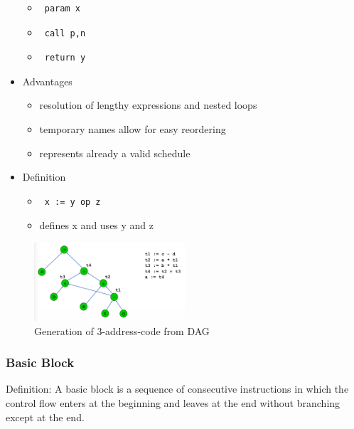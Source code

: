 \begin{itemize}
\begin{itemize}
	\item \begin{verbatim} param x\end{verbatim}
	\item \begin{verbatim} call p,n\end{verbatim}
	\item \begin{verbatim} return y\end{verbatim}
\end{itemize}
\item Advantages
\begin{itemize}
	\item resolution of lengthy expressions and nested loops
	\item temporary names allow for easy reordering
	\item represents already a valid schedule
\end{itemize}
\item Definition
\begin{itemize}
	\item \begin{verbatim} x := y op z\end{verbatim}
	\item defines x and uses y and z
\end{itemize}
\end{itemize}

\begin{figure}[h]
	\begin{center}
		\includegraphics[width=0.5\textwidth]{images/3-address.png}
		\caption{Generation of 3-address-code from DAG}
		\label{fig:3-address}
	\end{center}
\end{figure}

\subsubsection{Basic Block}
Definition: A basic block is a sequence of consecutive instructions in which the control flow enters at the beginning and leaves at the end without branching except at the end.

